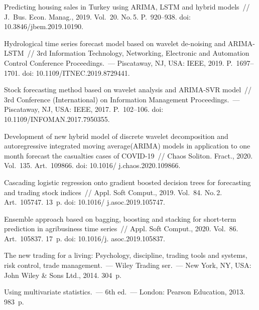 \begin{multicols}{2}
{{\begin{thebibliography}{99}
Predicting housing sales in Turkey using ARIMA, LSTM and hybrid models~//  J.~Bus. Econ. 
Manag., 2019. Vol.~20. No.\,5. P.~920--938.
doi: 10.3846/jbem.2019.10190.

 Hydrological time series forecast model based on wavelet de-noising and ARIMA-LSTM~//  
 3rd Information Technology, Networking, Electronic and Automation Control Conference Proceedings.~--- 
 Piscataway, NJ, USA: IEEE, 2019. P.~1697--1701. doi: 10.1109/\linebreak ITNEC.2019.8729441.




Stock forecasting method based on wavelet analysis and ARIMA-SVR model~// 3rd Conference 
(International) on Information Management Proceedings.~--- Piscataway, NJ, USA: IEEE, 2017. P.~102--106. 
doi: 10.1109/\mbox{INFOMAN}.2017.7950355.

Development of new hybrid model of discrete wavelet decomposition and autoregressive integrated 
moving average\linebreak (\mbox{ARIMA}) models in application to one month forecast the casualties cases of COVID-19~// 
Chaos Soliton. Fract., 2020. Vol.~135. Art.~109866.  doi: 10.1016/ j.chaos.2020.109866.

Cascading logistic regression onto gradient boosted decision trees for forecasting and trading stock 
indices~//  Appl. Soft Comput., 2019. Vol.~84. No.\,2. Art.~105747. 13~p. doi: 10.1016/ j.asoc.2019.105747.

Ensemble approach based on bagging, boosting and stacking for short-term prediction in 
agribusiness time series~// Appl. Soft Comput., 2020. Vol.~86. Art.~105837. 17~p.
 doi: 10.1016/j. asoc.2019.105837.




The new trading for a living: Psychology, discipline, trading tools and systems, risk control, 
trade management.~--- 
Wiley Trading ser.~--- New York, NY, USA: John Wiley \& Sons Ltd., 2014. 304~p.

 Using multivariate statistics.~--- 6th ed.~--- London: Pearson Education, 2013. 983~p.



\end{thebibliography}}}
\end{multicols}

